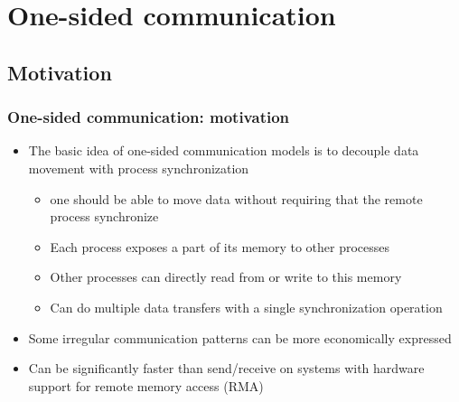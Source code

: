 \documentclass{beamer}
\begin{document}
\section{One-sided communication}
\subsection{Motivation}
\begin{frame}[fragile]
  \frametitle{One-sided communication: motivation}
\begin{itemize}
\item The basic idea of one-sided communication models is to
decouple data movement with process synchronization
\begin{itemize}
\item one should be able to move data without requiring that the remote
process synchronize
\item Each process exposes a part of its memory to other processes
\item Other processes can directly read from or write to this memory
\item Can do multiple data transfers with a single
synchronization operation
\end{itemize}
\item Some irregular communication patterns can be
more economically expressed
\item Can be significantly faster than send/receive
on systems with hardware support for remote
memory access (RMA)
\end{itemize}
\end{frame}
\end{document}
